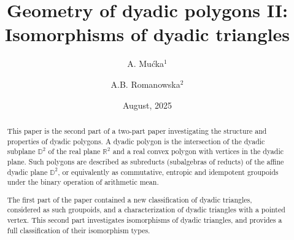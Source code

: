 \documentclass[12pt]{amsart}
\def\mbR{\mathbb{R}}
\def\mbD{\mathbb{D}}
\theoremstyle{plain}
\theoremstyle{definition}
\numberwithin{equation}{section}
\begin{document}
\textcolor[rgb]{0,0,1}{}

\title[Geometry of dyadic polygons II] {Geometry of dyadic polygons II:\\ Isomorphisms of dyadic triangles}



\author[Mu\'{c}ka]{A. Mu\'{c}ka$^1$}
\address{$^1$ Faculty of Mathematics and Information Sciences\\
Warsaw University of Technology\\
00-661 Warsaw, Poland}

\author[Romanowska]{A.B. Romanowska$^2$}
\address{$^2$ Faculty of Mathematics and Information Sciences\\
Warsaw University of Technology\\
00-661 Warsaw, Poland}






\date{August, 2025}

\begin{abstract}
This paper is the second part of a two-part paper investigating the structure and properties of dyadic polygons. A dyadic polygon is the intersection of the dyadic subplane $\mbD^2$ of the real plane $\mbR^2$ and a real convex polygon with vertices in the dyadic plane. Such polygons are described as subreducts (subalgebras of reducts) of the affine dyadic plane $\mbD^2$, or equivalently as commutative, entropic and idempotent groupoids under the binary operation of arithmetic mean.

The first part of the paper contained a new classification of dyadic triangles, considered as
such groupoids, and a characterization of dyadic triangles with a pointed vertex.
This second part investigates isomorphisms of dyadic triangles, and provides a full
classification of their isomorphism types.
\end{abstract}

\maketitle

\end{document}
